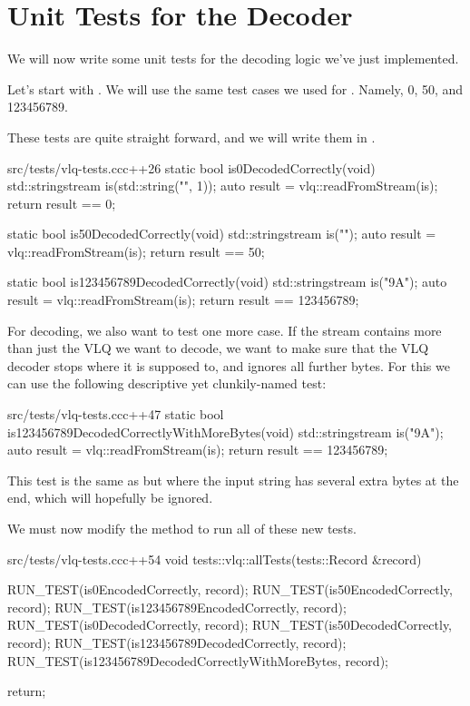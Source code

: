 \section{Unit Tests for the Decoder}

We will now write some unit tests for the decoding logic we've just implemented.

Let's start with . We will use the same test cases we used for . Namely, 0, 50, and 123456789.

These tests are quite straight forward, and we will write them in .

\begin{file}{src/tests/vlq-tests.cc}{c++}{26}
static bool is0DecodedCorrectly(void)
{
    std::stringstream is(std::string("\0", 1));
    auto result = vlq::readFromStream(is);
    return result == 0;
}

static bool is50DecodedCorrectly(void)
{
    std::stringstream is("");
    auto result = vlq::readFromStream(is);
    return result == 50;
}

static bool is123456789DecodedCorrectly(void)
{
    std::stringstream is("\xBA\xEF\x9A");
    auto result = vlq::readFromStream(is);
    return result == 123456789;
}
\end{file}

For decoding, we also want to test one more case. If the stream contains more than just the VLQ we want to decode, we want to make sure that the VLQ decoder stops where it is supposed to, and ignores all further bytes. For this we can use the following descriptive yet clunkily-named test:

\begin{file}{src/tests/vlq-tests.cc}{c++}{47}
static bool is123456789DecodedCorrectlyWithMoreBytes(void)
{
    std::stringstream is("\xBA\xEF\x9A");
    auto result = vlq::readFromStream(is);
    return result == 123456789;
}
\end{file}

This test is the same as  but where the input string has several extra bytes at the end, which will hopefully be ignored.

We must now modify the  method to run all of these new tests.

\begin{file}{src/tests/vlq-tests.cc}{c++}{54}
void tests::vlq::allTests(tests::Record &record)
{

    RUN_TEST(is0EncodedCorrectly, record);
    RUN_TEST(is50EncodedCorrectly, record);
    RUN_TEST(is123456789EncodedCorrectly, record);
    RUN_TEST(is0DecodedCorrectly, record);
    RUN_TEST(is50DecodedCorrectly, record);
    RUN_TEST(is123456789DecodedCorrectly, record);
    RUN_TEST(is123456789DecodedCorrectlyWithMoreBytes, record);

    return;
}
\end{file}

